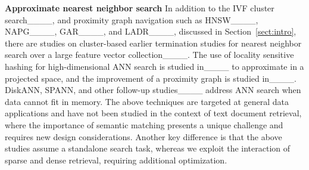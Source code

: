 \textbf{Approximate nearest neighbor search}
In addition to the IVF cluster 
search____, and proximity graph navigation such as HNSW____, NAPG____,
GAR____,  and LADR____, discussed in Section~\ref{sect:intro}, 
there  are studies on  cluster-based earlier termination studies for nearest neighbor search over a large   
feature vector collection____.
The use of locality sensitive hashing  for high-dimensional ANN search 
is studied in____ to approximate in
a projected space, and the improvement of a proximity graph is studied in____.
DiskANN, SPANN,  and other follow-up studies____
address ANN search when data cannot fit in memory. 
The above techniques are targeted at general data applications and have not been studied in the context of text document retrieval,
where the importance of semantic matching presents a unique challenge and requires new design considerations.
Another key difference is that the above studies assume a standalone search task,
whereas we exploit the interaction of sparse and dense retrieval, requiring additional optimization.
